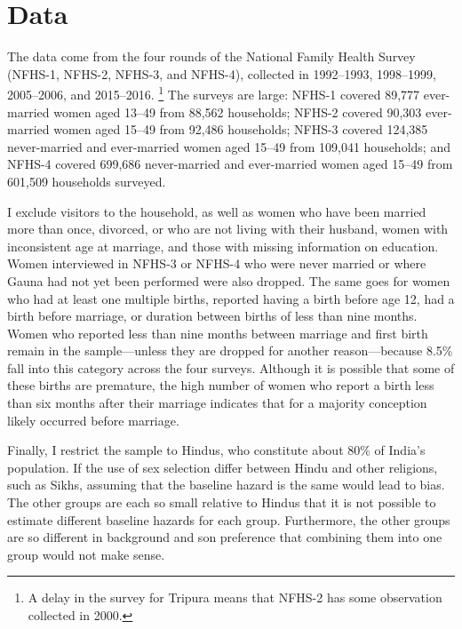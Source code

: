 \documentclass[12pt,letterpaper]{article}
\begin{document}
\section{Data\label{sec:data}}

The data come from the four rounds of the National Family Health Survey 
(NFHS-1, NFHS-2, NFHS-3, and NFHS-4),
collected in 1992--1993, 1998--1999, 2005--2006, and 2015--2016.%
\footnote{
A delay in the survey for Tripura means that NFHS-2 has some observation 
collected in 2000.
}
The surveys are large: NFHS-1 covered 89,777 ever-married women 
aged 13--49 from 88,562 households;
NFHS-2 covered 90,303 ever-married women aged 15--49 from 92,486 households;
NFHS-3 covered 124,385 never-married and ever-married women aged 
15--49 from 109,041 households;
and 
NFHS-4 covered 699,686 never-married and ever-married women aged
15--49 from 601,509 households surveyed.

I exclude visitors to the household, as well as
women who have been married more than once, divorced, or who are 
not living with their husband,
women with inconsistent age at marriage,
and those with missing information on education.
Women interviewed in NFHS-3 or NFHS-4 who were never married or where Gauna 
had not yet been performed were also dropped.
The same goes for women who had at least one multiple births,
reported having a birth before age 12, had a birth before marriage, or
duration between births of less than nine months.
Women who reported less than nine months between marriage and first birth
remain in the sample---unless they are dropped for another reason---because 
8.5\% fall into this category across the four surveys.
Although it is possible that some of these births are premature, the high number of
women who report a birth less than six months after their marriage indicates that for
a majority conception likely occurred before marriage.

Finally, I restrict the sample to Hindus,
who constitute about 80\% of India's population.
If the use of sex selection differ between Hindu and other religions, such 
as Sikhs, assuming that the baseline hazard is the same would lead to bias.
The other groups are each so small relative to Hindus that it is not
possible to estimate different baseline hazards for each group.
Furthermore, the other groups are so different in background and son 
preference that combining them into one group would not make sense.
\end{document}
